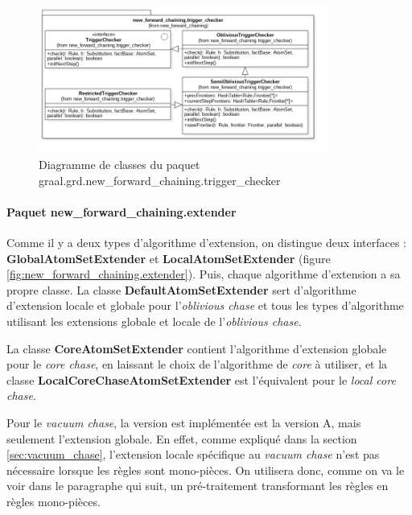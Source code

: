        \begin{figure}[h]
        \centering
        \includegraphics[width=0.85\textwidth]{pictures/new_forward_chaining-trigger_checker.png}
        \vspace{-30pt}
        \caption{Diagramme de classes du paquet graal.grd.new\_forward\_chaining.trigger\_checker}
        \label{fig:new_forward_chaining.trigger_checker}
        \end{figure}
       
       \paragraph{Paquet new\_forward\_chaining.extender}
       
       Comme il y a deux types d'algorithme d'extension, on distingue deux interfaces : \textbf{GlobalAtomSetExtender} et \textbf{LocalAtomSetExtender} (figure \ref{fig:new_forward_chaining.extender}). Puis, chaque algorithme d'extension a sa propre classe. La classe \textbf{DefaultAtomSetExtender} sert d'algorithme d'extension locale et globale pour l'\textit{oblivious chase} et tous les types d'algorithme utilisant les extensions globale et locale de l'\textit{oblivious chase}.
       \par La classe \textbf{CoreAtomSetExtender} contient l'algorithme d'extension globale pour le \textit{core chase}, en laissant le choix de l'algorithme de \textit{core} à utiliser, et la classe \textbf{LocalCoreChaseAtomSetExtender} est l'équivalent pour le \textit{local core chase}.
       \par Pour le \textit{vacuum chase}, la version est implémentée est la version A, mais seulement l'extension globale. En effet, comme expliqué dans la section \ref{sec:vacuum_chase}, l'extension locale spécifique au \textit{vacuum chase} n'est pas nécessaire lorsque les règles sont mono-pièces. On utilisera donc, comme on va le voir dans le paragraphe qui suit, un pré-traitement transformant les règles en règles mono-pièces.
       
